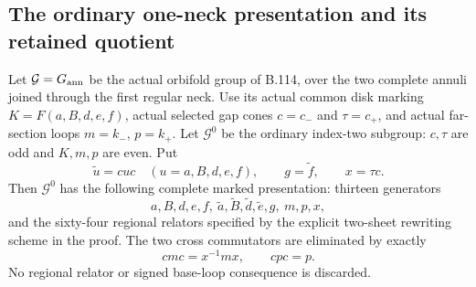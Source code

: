 \subsection*{The ordinary one-neck presentation and its retained quotient}

\label{stmt:B119}
Let $\mathcal G=G_{\rm ann}$ be the actual orbifold group of B.114,
over the two complete annuli joined through the first regular neck.
Use its actual common disk marking
$K=F(a,B,d,e,f)$, actual selected gap cones
$c=c_-$ and $\tau=c_+$, and actual far-section loops
$m=k_-$, $p=k_+$. Let $\mathcal G^0$ be the ordinary index-two
subgroup: $c,\tau$ are odd and $K,m,p$ are even. Put
\[
 \widetilde u=cuc\quad(u=a,B,d,e,f),\qquad
 g=\widetilde f,\qquad x=\tau c.
\]
Then $\mathcal G^0$ has the following complete marked presentation:
thirteen generators
\begin{equation}\label{eq:B119-thirteen}
 a,B,d,e,f,\ \widetilde a,\widetilde B,\widetilde d,
 \widetilde e,g,\ m,p,x,
\end{equation}
and the sixty-four regional relators specified by the explicit
two-sheet rewriting scheme in the proof. The two cross commutators
are eliminated by exactly
\begin{equation}\label{eq:B119-cross-elimination}
 cmc=x^{-1}mx,\qquad cpc=p.
\end{equation}
No regional relator or signed base-loop consequence is discarded.

